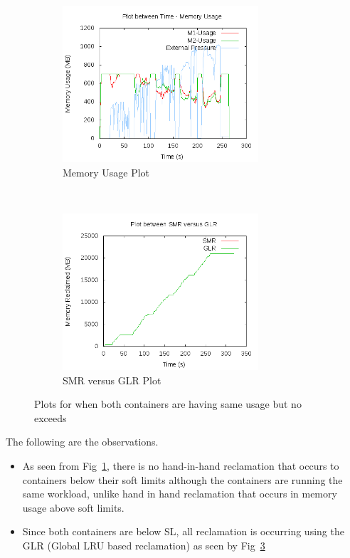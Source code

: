 	\begin{figure}[t!]
	    \centering
	    \begin{subfigure}[t]{0.48\textwidth}
	      \centering
	      \includegraphics[width=0.8\textwidth]{images/controller_issues/global_lru/mu.png}
	      \caption{Memory Usage Plot}
	      \label{img_no_sl_mu}
	    \end{subfigure}
	    ~ 
	    \begin{subfigure}[t]{0.48\textwidth}
	      \centering
	      \includegraphics[width=0.8\textwidth]{images/controller_issues/global_lru/compare.png}
	      \caption{SMR versus GLR Plot}
	      \label{img_no_sl_global_vs_local}
	    \end{subfigure}
	    \caption{Plots for when both containers are having same usage but no exceeds}
	  \end{figure}
	
	  The following are the observations.
	  \begin{itemize}
	    \item As seen from Fig~\ref{img_no_sl_mu}, there is no hand-in-hand reclamation that occurs to containers below their soft 
  limits although the containers are running the same workload, unlike hand in hand reclamation that occurs in memory usage above soft limits.
	    \item Since both containers are below SL, all reclamation is occurring using the GLR (Global LRU based reclamation) as seen by 
  Fig~\ref{img_no_sl_global_vs_local}
	  \end{itemize}

